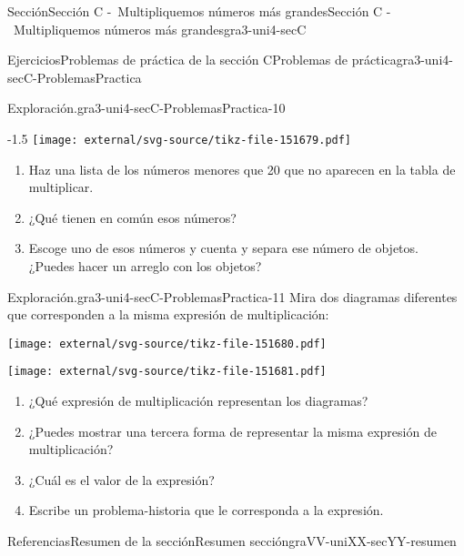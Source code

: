 \documentclass[twoside,14pt,]{extarticle}
\begin{document}
\begin{sectionptx}{Sección}{Sección C -~Multipliquemos números más grandes}{}{Sección C -~Multipliquemos números más grandes}{}{}{gra3-uni4-secC}
\begin{exercises-subsection}{Ejercicios}{Problemas de práctica de la sección C}{}{Problemas de práctica}{}{}{gra3-uni4-secC-ProblemasPractica}
\begin{divisionexercise}{8}{Exploración.}{}{gra3-uni4-secC-ProblemasPractica-10}
\begin{image}{0}{1}{0}{-1.5\baselineskip}%
\texttt{[image: external/svg-source/tikz-file-151679.pdf]}
\end{image}%
%
\begin{enumerate}[label=(\alph*)]
\item{}Haz una lista de los números menores que 20 que no aparecen en la tabla de multiplicar.%
\item{}¿Qué tienen en común esos números?%
\item{}Escoge uno de esos números y cuenta y separa ese número de objetos. ¿Puedes hacer un arreglo con los objetos?%
\end{enumerate}
\end{divisionexercise}%
\begin{divisionexercise}{9}{Exploración.}{}{gra3-uni4-secC-ProblemasPractica-11}%
Mira dos diagramas diferentes que corresponden a la misma expresión de multiplicación:%
\begin{sidebyside}{2}{0.025}{0.025}{0.05}%
\begin{sbspanel}{0.45}%
\texttt{[image: external/svg-source/tikz-file-151680.pdf]}
\end{sbspanel}%
\begin{sbspanel}{0.45}%
\texttt{[image: external/svg-source/tikz-file-151681.pdf]}
\end{sbspanel}%
\end{sidebyside}%
%
\begin{enumerate}[label=(\alph*)]
\item{}¿Qué expresión de multiplicación representan los diagramas?%
\item{}¿Puedes mostrar una tercera forma de representar la misma expresión de multiplicación?%
\item{}¿Cuál es el valor de la expresión?%
\item{}Escribe un problema-historia que le corresponda a la expresión.%
\end{enumerate}
\end{divisionexercise}%
\end{exercises-subsection}
%
%
\typeout{************************************************}
\typeout{************************************************}
%
\begin{references-subsection}{Referencias}{Resumen de la sección}{}{Resumen sección}{}{}{graVV-uniXX-secYY-resumen}

\end{references-subsection}
\end{sectionptx}
\end{document}
